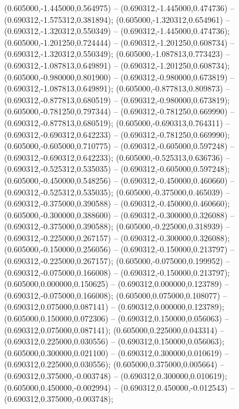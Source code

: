  (0.605000,-1.445000,0.564975) -- (0.690312,-1.445000,0.474736) -- (0.690312,-1.575312,0.381894);
 (0.605000,-1.320312,0.654961) -- (0.690312,-1.320312,0.550349) -- (0.690312,-1.445000,0.474736);
 (0.605000,-1.201250,0.724444) -- (0.690312,-1.201250,0.608734) -- (0.690312,-1.320312,0.550349);
 (0.605000,-1.087813,0.773423) -- (0.690312,-1.087813,0.649891) -- (0.690312,-1.201250,0.608734);
 (0.605000,-0.980000,0.801900) -- (0.690312,-0.980000,0.673819) -- (0.690312,-1.087813,0.649891);
 (0.605000,-0.877813,0.809873) -- (0.690312,-0.877813,0.680519) -- (0.690312,-0.980000,0.673819);
 (0.605000,-0.781250,0.797344) -- (0.690312,-0.781250,0.669990) -- (0.690312,-0.877813,0.680519);
 (0.605000,-0.690313,0.764311) -- (0.690312,-0.690312,0.642233) -- (0.690312,-0.781250,0.669990);
 (0.605000,-0.605000,0.710775) -- (0.690312,-0.605000,0.597248) -- (0.690312,-0.690312,0.642233);
 (0.605000,-0.525313,0.636736) -- (0.690312,-0.525312,0.535035) -- (0.690312,-0.605000,0.597248);
 (0.605000,-0.450000,0.548256) -- (0.690312,-0.450000,0.460660) -- (0.690312,-0.525312,0.535035);
 (0.605000,-0.375000,0.465039) -- (0.690312,-0.375000,0.390588) -- (0.690312,-0.450000,0.460660);
 (0.605000,-0.300000,0.388600) -- (0.690312,-0.300000,0.326088) -- (0.690312,-0.375000,0.390588);
 (0.605000,-0.225000,0.318939) -- (0.690312,-0.225000,0.267157) -- (0.690312,-0.300000,0.326088);
 (0.605000,-0.150000,0.256056) -- (0.690312,-0.150000,0.213797) -- (0.690312,-0.225000,0.267157);
 (0.605000,-0.075000,0.199952) -- (0.690312,-0.075000,0.166008) -- (0.690312,-0.150000,0.213797);
 (0.605000,0.000000,0.150625) -- (0.690312,0.000000,0.123789) -- (0.690312,-0.075000,0.166008);
 (0.605000,0.075000,0.108077) -- (0.690312,0.075000,0.087141) -- (0.690312,0.000000,0.123789);
 (0.605000,0.150000,0.072306) -- (0.690312,0.150000,0.056063) -- (0.690312,0.075000,0.087141);
 (0.605000,0.225000,0.043314) -- (0.690312,0.225000,0.030556) -- (0.690312,0.150000,0.056063);
 (0.605000,0.300000,0.021100) -- (0.690312,0.300000,0.010619) -- (0.690312,0.225000,0.030556);
 (0.605000,0.375000,0.005664) -- (0.690312,0.375000,-0.003748) -- (0.690312,0.300000,0.010619);
 (0.605000,0.450000,-0.002994) -- (0.690312,0.450000,-0.012543) -- (0.690312,0.375000,-0.003748);
